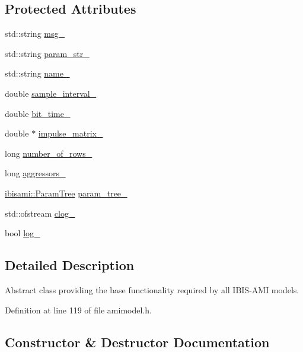 \subsection*{Protected Attributes}
\begin{DoxyCompactItemize}
\item 
std\+::string \hyperlink{class_a_m_i_model_acc9d4703088b0a69f649c84a1e134cfd}{msg\+\_\+}
\item 
std\+::string \hyperlink{class_a_m_i_model_ab7aeef08245acc654271341cdf0139f9}{param\+\_\+str\+\_\+}
\item 
std\+::string \hyperlink{class_a_m_i_model_a42e00992da9baf93d81d1d9fcd32d8e6}{name\+\_\+}
\item 
double \hyperlink{class_a_m_i_model_a4d4c286b04668c22f2e3f315715a6d5b}{sample\+\_\+interval\+\_\+}
\item 
double \hyperlink{class_a_m_i_model_ad0b6751b3b3a69fb8951fde0fcdf4f27}{bit\+\_\+time\+\_\+}
\item 
double $\ast$ \hyperlink{class_a_m_i_model_a26c35bff12c048655bdbd8663a2f0f58}{impulse\+\_\+matrix\+\_\+}
\item 
long \hyperlink{class_a_m_i_model_aaaf94b76a519e60318e1874bb190e9a8}{number\+\_\+of\+\_\+rows\+\_\+}
\item 
long \hyperlink{class_a_m_i_model_aab3a042b2459b4b838cb61bf92a50d03}{aggressors\+\_\+}
\item 
\hyperlink{structibisami_1_1_param_tree}{ibisami\+::\+Param\+Tree} \hyperlink{class_a_m_i_model_a4da53456e13a1224f2bb47396ab0ecbd}{param\+\_\+tree\+\_\+}
\item 
std\+::ofstream \hyperlink{class_a_m_i_model_a9b1c44767e4e81c4dfcff9bc23907b6c}{clog\+\_\+}
\item 
bool \hyperlink{class_a_m_i_model_ae701c08f6c4b0d962df4a2f2dcb6196b}{log\+\_\+}
\end{DoxyCompactItemize}


\subsection{Detailed Description}
Abstract class providing the base functionality required by all I\+B\+I\+S-\/\+A\+M\+I models. 

Definition at line 119 of file amimodel.\+h.



\subsection{Constructor \& Destructor Documentation}
\hypertarget{class_a_m_i_model_a6c266bc8306cef0ed802c49c8847e8fc}{}
